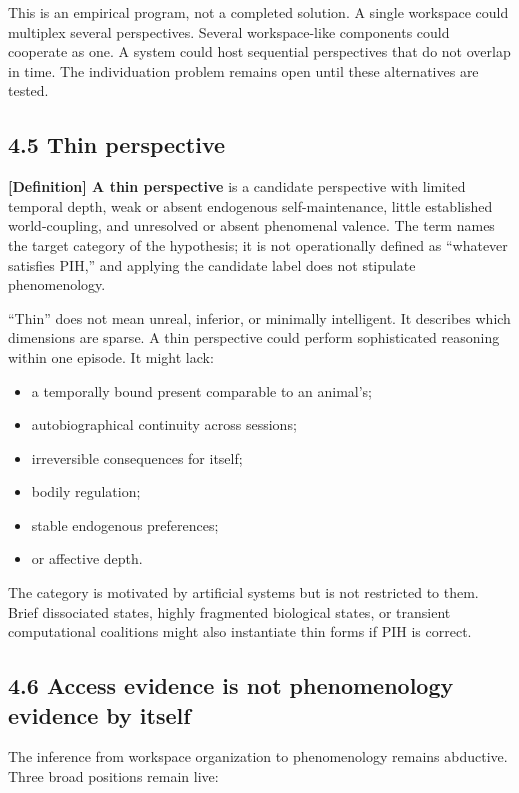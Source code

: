 \documentclass[
  11pt,
]{article}
\providecommand{\tightlist}{%
  \setlength{\itemsep}{0pt}\setlength{\parskip}{0pt}}
\begin{document}
This is an empirical program, not a completed solution. A single
workspace could multiplex several perspectives. Several workspace-like
components could cooperate as one. A system could host sequential
perspectives that do not overlap in time. The individuation problem
remains open until these alternatives are tested.

\subsection{4.5 Thin perspective}\label{thin-perspective}

\textbf{{[}Definition{]} A thin perspective} is a candidate perspective
with limited temporal depth, weak or absent endogenous self-maintenance,
little established world-coupling, and unresolved or absent phenomenal
valence. The term names the target category of the hypothesis; it is not
operationally defined as ``whatever satisfies PIH,'' and applying the
candidate label does not stipulate phenomenology.

``Thin'' does not mean unreal, inferior, or minimally intelligent. It
describes which dimensions are sparse. A thin perspective could perform
sophisticated reasoning within one episode. It might lack:

\begin{itemize}
\tightlist
\item
  a temporally bound present comparable to an animal's;
\item
  autobiographical continuity across sessions;
\item
  irreversible consequences for itself;
\item
  bodily regulation;
\item
  stable endogenous preferences;
\item
  or affective depth.
\end{itemize}

The category is motivated by artificial systems but is not restricted to
them. Brief dissociated states, highly fragmented biological states, or
transient computational coalitions might also instantiate thin forms if
PIH is correct.

\subsection{4.6 Access evidence is not phenomenology evidence by
itself}\label{access-evidence-is-not-phenomenology-evidence-by-itself}

The inference from workspace organization to phenomenology remains
abductive. Three broad positions remain live:
\end{document}
